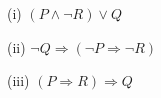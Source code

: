 \documentclass{article}
\begin{document}
(i) $(P \land \neg R) \lor Q$


(ii) $\neg Q \Rightarrow (\neg P \Rightarrow \neg R)$

(iii) $(P \Rightarrow R) \Rightarrow Q$
\end{document}
